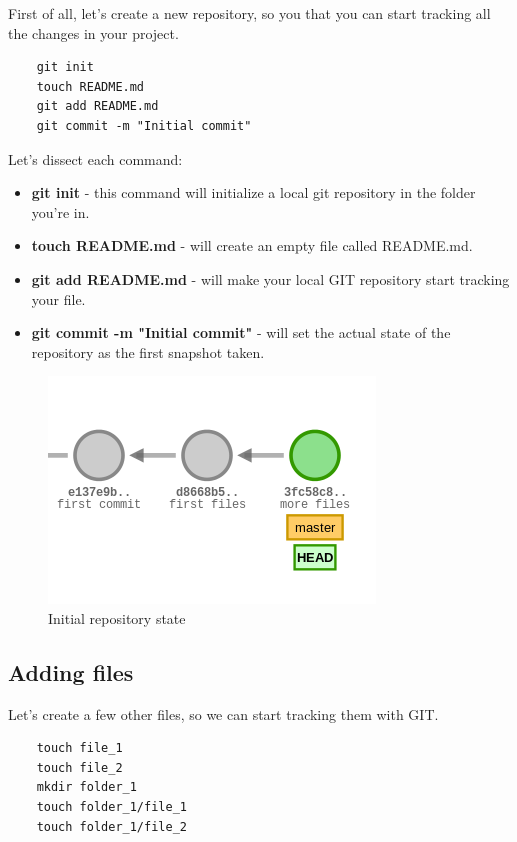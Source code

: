 \documentclass{article}
\begin{document}
First of all, let's create a new repository, so you that you can start tracking all the changes in your project.

\begin{lstlisting}
	git init
	touch README.md
	git add README.md
	git commit -m "Initial commit"
\end{lstlisting}

Let's dissect each command:\\

\begin{itemize}
\item{\textbf{git init} - this command will initialize a local git repository in the folder you're in.}
\item{\textbf{touch README.md} - will create an empty file called README.md.}
\item{\textbf{git add README.md} - will make your local GIT repository start tracking your file.}
\item{\textbf{git commit -m "Initial commit"} - will set the actual state of the repository as the first snapshot taken.}
\end{itemize}

\begin{figure}[H]
\centerline{\includegraphics[scale=0.5]{initial_repository.png}}
\caption{Initial repository state}
\label{fig1}
\end{figure}

\subsection{Adding files}

Let's create a few other files, so we can start tracking them with GIT.

\begin{lstlisting}
	touch file_1
	touch file_2
	mkdir folder_1
	touch folder_1/file_1
	touch folder_1/file_2
\end{lstlisting}
\end{document}
